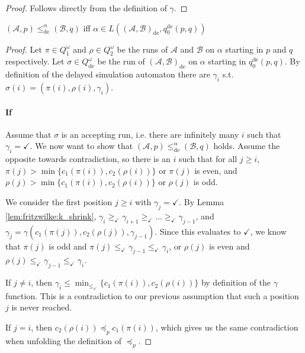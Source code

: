 \begin{proof}
	Follows directly from the definition of $\gamma$.
\end{proof}

\begin{lem}
	$(\mathcal{A}, p) \leq_\text{de}^\alpha (\mathcal{B}, q)$ iff $\alpha \in L((\mathcal{A}, \mathcal{B})_\text{de}, q_0^\text{de}(p, q))$
\end{lem}

\begin{proof} 
	Let $\pi \in Q_1^\omega$ and $\rho \in Q_2^\omega$ be the runs of $\mathcal{A}$ and $\mathcal{B}$ on $\alpha$ starting in $p$ and $q$ respectively. Let $\sigma \in Q_\text{de}^\omega$ be the run of $(\mathcal{A}, \mathcal{B})_\text{de}$ on $\alpha$ starting in $q_0^\text{de}(p, q)$. By definition of the delayed simulation automaton there are $\gamma_i$ s.t. $\sigma(i) = (\pi(i), \rho(i), \gamma_i)$.
	
	\paragraph{If} Assume that $\sigma$ is an accepting run, i.e. there are infinitely many $i$ such that $\gamma_i = \checkmark$. We now want to show that $(\mathcal{A}, p) \leq_\text{de}^\alpha (\mathcal{B}, q)$ holds. Assume the opposite towards contradiction, so there is an $i$ such that for all $j \geq i$, $\pi(j) > \min \{c_1(\pi(i)), c_2(\rho(i))\}$ or $\pi(j)$ is even, and $\rho(j) > \min \{c_1(\pi(i)), c_2(\rho(i))\}$ or $\rho(j)$ is odd.
	
	We consider the first position $j \geq i$ with $\gamma_j = \checkmark$. By Lemma \ref{lem:fritzwilke:k_shrink}, $\gamma_i \geq_\checkmark \gamma_{i+1} \geq_\checkmark \dots \geq_\checkmark \gamma_{j-1}$, and $\gamma_j = \gamma(c_1(\pi(j)), c_2(\rho(j)), \gamma_{j-1})$. Since this evaluates to $\checkmark$, we know that $\pi(j)$ is odd and $\pi(j) \leq_\checkmark \gamma_{j-1} \leq_\checkmark \gamma_i$, or $\rho(j)$ is even and $\rho(j) \leq_\checkmark \gamma_{j-1} \leq_\checkmark \gamma_i$.
	
	If $j \neq i$, then $\gamma_i \leq \min_{\leq_\checkmark}\{ c_1(\pi(i)), c_2(\rho(i)) \}$ by definition of the $\gamma$ function. This is a contradiction to our previous assumption that such a position $j$ is never reached.
	
	If $j = i$, then $c_2(\rho(i)) \preceq_p c_1(\pi(i))$, which gives us the same contradiction when unfolding the definition of $\preceq_p$.
	

\end{proof}
